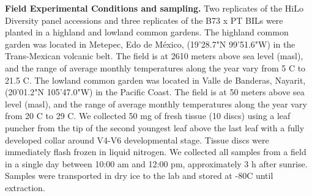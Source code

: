 \documentclass[9pt,twocolumn,twoside,lineno]{BioRxiv}
\begin{document}
\textbf{Field Experimental Conditions and sampling.} 
Two replicates of the HiLo Diversity panel accessions and three replicates of the B73 x PT BILs were planted in a highland and lowland common gardens. 
The highland common garden was located in Metepec, Edo de México, (19'28.7"N 99'51.6"W) in the Trans-Mexican volcanic belt. 
The field is at 2610 meters above sea level (masl), and the range of average monthly temperatures along the year vary from 5 \degree C to 21.5 \degree C.  
The lowland common garden was located in Valle de Banderas, Nayarit, (20'01.2"N 105'47.0"W) in the Pacific Coast. 
The field is at 50 meters above sea level (masl), and the range of average monthly temperatures along the year vary from 20 \degree C to 29 \degree C.
We collected 50 mg of fresh tissue (10 discs) using a leaf puncher from the tip of the second youngest leaf above the last leaf with a fully developed collar around V4-V6 developmental stage. 
Tissue discs were immediately flash frozen in liquid nitrogen. 
We collected all samples from a field in a single day between 10:00 am and 12:00 pm, approximately 3 h after sunrise. Samples were transported in dry ice to the lab and stored at -80\degree C until extraction. 
\end{document}
